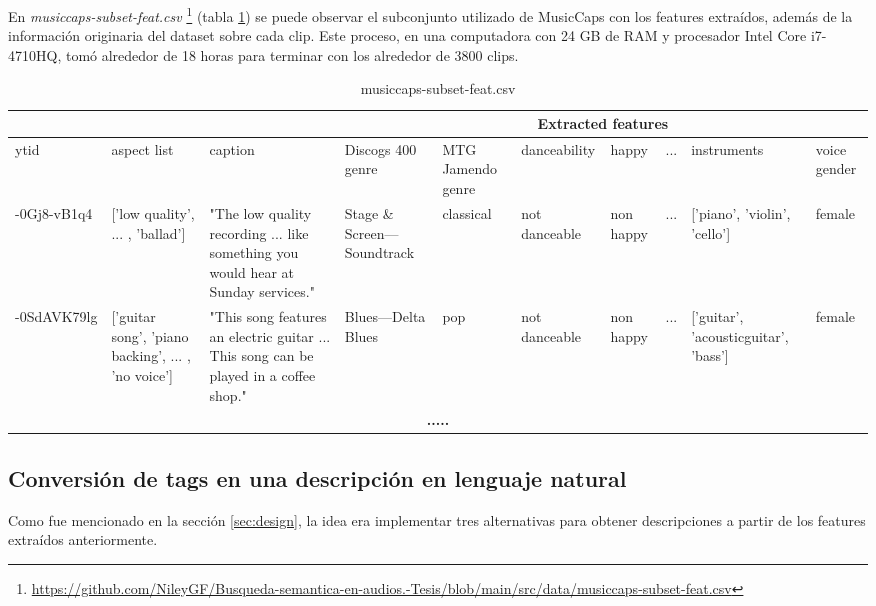 En \textit{musiccaps-subset-feat.csv} \footnote{\href{https://github.com/NileyGF/Busqueda-semantica-en-audios.-Tesis/blob/main/src/data/musiccaps-subset-feat.csv}{https://github.com/NileyGF/Busqueda-semantica-en-audios.-Tesis/blob/main/src/data/musiccaps-subset-feat.csv}} (tabla \ref{tab:feat.csv}) se puede observar el subconjunto utilizado de MusicCaps con los features extraídos, además de la información originaria del dataset sobre cada clip. Este proceso, en una computadora con 24 GB de RAM y procesador Intel Core i7-4710HQ, tomó alrededor de 18 horas para terminar con los alrededor de 3800 clips.
\begin{table}[h]
    \tiny
    \centering
    \begin{tabular} { | p{5em} | p{4em} | p{6em} | p{4em} | p{4.5em} | p{4.5em} | p{4em} | c | p{4.8em} | p{4em} |}
    \hline
     \multicolumn{3}{|c|}{ } & \multicolumn{7}{|c|}{Extracted features} \\
    \hline
        ytid    & aspect list & caption &Discogs 400 genre & MTG Jamendo genre &danceability & happy & ... &instruments & voice gender\\ 
    \hline
    -0Gj8-vB1q4 &['low quality', ... , 'ballad'] &"The low quality recording ... like something you would hear at Sunday services." & 
                                    Stage \& Screen---Soundtrack & classical &not danceable &non happy & ... & ['piano', 'violin', 'cello'] & female \\
    \hline
    -0SdAVK79lg &['guitar song', 'piano backing', ... , 'no voice'] &"This song features an electric guitar ... This song can be played in a coffee shop."  
                                &Blues---Delta Blues & pop &not danceable & non happy & ... & ['guitar', 'acousticguitar', 'bass'] & female \\
    \hline
    \multicolumn{10}{|c|}{ \textbf{.....} } \\ 
    \hline
    \end{tabular}
    \caption{musiccaps-subset-feat.csv}
    \label{tab:feat.csv}
\end{table}

\subsection{Conversión de tags en una descripción en lenguaje natural}
\label{subsec:feat-to-text}

Como fue mencionado en la sección \ref{sec:design}, la idea era implementar tres alternativas para obtener descripciones a partir de los features extraídos anteriormente. \\

